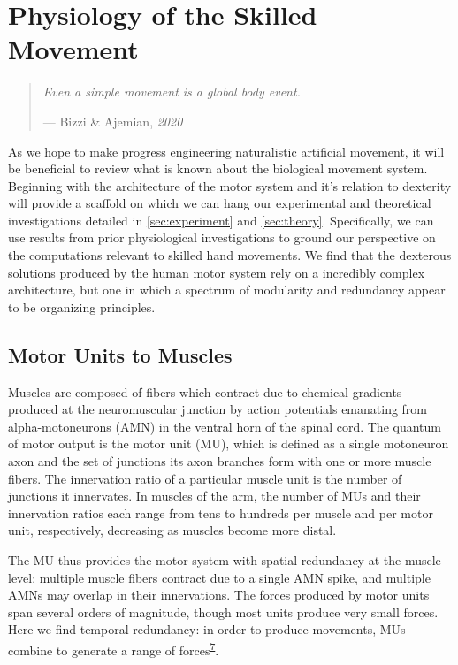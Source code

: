 \documentclass[
  a4paper,
]{article}
\begin{document}
\hypertarget{sec:physiology}{%
\section{Physiology of the Skilled Movement}\label{sec:physiology}}

\begin{quote}
\emph{Even a simple movement is a global body event.}

--- Bizzi \& Ajemian, \emph{2020}
\end{quote}

As we hope to make progress engineering naturalistic artificial
movement, it will be beneficial to review what is known about the
biological movement system. Beginning with the architecture of the motor
system and it's relation to dexterity will provide a scaffold on which
we can hang our experimental and theoretical investigations detailed in
\cref{sec:experiment} and \cref{sec:theory}. Specifically, we can use
results from prior physiological investigations to ground our
perspective on the computations relevant to skilled hand movements. We
find that the dexterous solutions produced by the human motor system
rely on a incredibly complex architecture, but one in which a spectrum
of modularity and redundancy appear to be organizing principles.

\hypertarget{motor-units-to-muscles}{%
\subsection{Motor Units to Muscles}\label{motor-units-to-muscles}}

Muscles are composed of fibers which contract due to chemical gradients
produced at the neuromuscular junction by action potentials emanating
from alpha-motoneurons (AMN) in the ventral horn of the spinal cord. The
quantum of motor output is the motor unit (MU), which is defined as a
single motoneuron axon and the set of junctions its axon branches form
with one or more muscle fibers. The innervation ratio of a particular
muscle unit is the number of junctions it innervates. In muscles of the
arm, the number of MUs and their innervation ratios each range from tens
to hundreds per muscle and per motor unit, respectively, decreasing as
muscles become more distal.

The MU thus provides the motor system with spatial redundancy at the
muscle level: multiple muscle fibers contract due to a single AMN spike,
and multiple AMNs may overlap in their innervations. The forces produced
by motor units span several orders of magnitude, though most units
produce very small forces. Here we find temporal redundancy: in order to
produce movements, MUs combine to generate a range of
forces\textsuperscript{\protect\hyperlink{ref-fuglevandMechanicalPropertiesNeural2011}{7}}.
\end{document}
